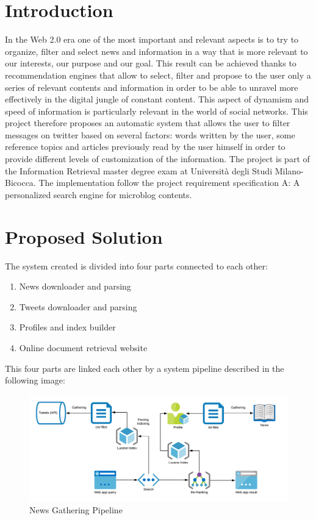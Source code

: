 \documentclass[11pt, english]{article}
\begin{document}
\tableofcontents
\newpage
\section{Introduction}

In the Web 2.0 era one of the most important and relevant aspects is to try to organize, filter and select news and information in a way that is more relevant to our interests, our purpose and our goal. 
\newline
This result can be achieved thanks to recommendation engines that allow to select, filter and propose to the user only a series of relevant contents and information in order to be able to unravel more effectively in the digital jungle of constant content. 
\newline
This aspect of dynamism and speed of information is particularly relevant in the world of social networks.
\newline \break
This project therefore proposes an automatic system that allows the user to filter messages on twitter based on several factors: words written by the user, some reference topics and articles previously read by the user himself in order to provide different levels of customization of the information.
\newline \break
The project is part of the Information Retrieval master degree exam at Università degli Studi Milano-Bicocca.
The implementation follow the project requirement specification A: A personalized search engine for microblog contents.

\newpage

\section{Proposed Solution}

The system created is divided into four parts connected to each other:
\begin{enumerate}
\item News downloader and parsing
\item Tweets downloader and parsing
\item Profiles and index builder
\item Online document retrieval website
\end{enumerate}
This four parts are linked each other by a system pipeline described in the following image:

\begin{figure}[H]
  \includegraphics[width=16cm]{Resources/OverallArchitecture.png}
  \caption{News Gathering Pipeline} 
\end{figure}
\end{document}
